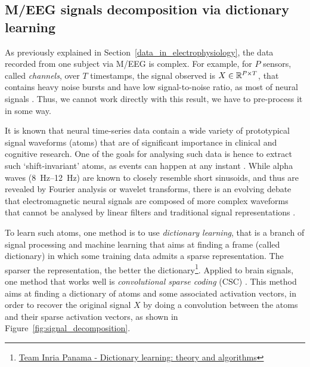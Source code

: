 \subsection{M/EEG signals decomposition via dictionary learning}\label{meeg_decomposition}

As previously explained in Section~\ref{data_in_electrophysiology}, the data recorded from one subject via M/EEG is complex.
For example, for $P$ sensors, called \textit{channels}, over $T$ timestamps, the signal observed is $X \in \mathbb{R}^{P\times T}$, that contains heavy noise bursts and have low signal-to-noise ratio, as most of neural signals \citep{jas2017learning}.
Thus, we cannot work directly with this result, we have to pre-process it in some way. 

It is known that neural time-series data contain a wide variety of prototypical signal waveforms (atoms) that are of significant importance in clinical and cognitive research.
One of the goals for analysing such data is hence to extract such `shift-invariant' atoms, as events can happen at any instant \citep{jas2017learning}.
While alpha waves (\SIrange{8}{12}{\hertz}) are known to closely resemble short sinusoids, and thus are revealed by Fourier analysis or wavelet transforms, there is an evolving debate that electromagnetic neural signals are composed of more complex waveforms that cannot be analysed by linear filters and traditional signal representations \cite{dupre2018multivariate}.

To learn such atoms, one method is to use \textit{dictionary learning}, that is a branch of signal processing and machine learning that aims at finding a frame (called dictionary) in which some training data admits a sparse representation.
The sparser the representation, the better the dictionary\footnote{\href{https://team.inria.fr/panama/fr/projects/please/dictionary-learning/}{Team Inria Panama - Dictionary learning: theory and algorithms}}.
Applied to brain signals, one method that works well is \textit{convolutional sparse coding} (CSC) \citep{jas2017learning, dupre2018multivariate, moreau2019distributed}.
This method aims at finding a dictionary of atoms and some associated activation vectors, in order to recover the original signal $X$ by doing a convolution between the atoms and their sparse activation vectors, as shown in Figure~\ref{fig:signal_decomposition}.

